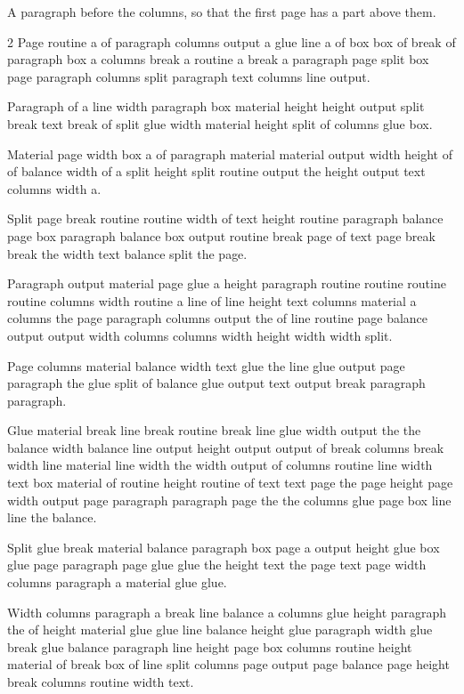 \documentclass{article}
\begin{document}
A paragraph before the columns, so that the first page has a part above them.

\begin{multicols}{2}
Page routine a of paragraph columns output a glue line a of box box of break of paragraph box a columns break a routine a break a paragraph page split box page paragraph columns split paragraph text columns line output.

Paragraph of a line width paragraph box material height height output split break text break of split glue width material height split of columns glue box.

Material page width box a of paragraph material material output width height of of balance width of a split height split routine output the height output text columns width a.

Split page break routine routine width of text height routine paragraph balance page box paragraph balance box output routine break page of text page break break the width text balance split the page.

Paragraph output material page glue a height paragraph routine routine routine routine columns width routine a line of line height text columns material a columns the page paragraph columns output the of line routine page balance output output width columns columns width height width width split.

Page columns material balance width text glue the line glue output page paragraph the glue split of balance glue output text output break paragraph paragraph.

Glue material break line break routine break line glue width output the the balance width balance line output height output output of break columns break width line material line width the width output of columns routine line width text box material of routine height routine of text text page the page height page width output page paragraph paragraph page the the columns glue page box line line the balance.

Split glue break material balance paragraph box page a output height glue box glue page paragraph page glue glue the height text the page text page width columns paragraph a material glue glue.

Width columns paragraph a break line balance a columns glue height paragraph the of height material glue glue line balance height glue paragraph width glue break glue balance paragraph line height page box columns routine height material of break box of line split columns page output page balance page height break columns routine width text.


\end{multicols}
\end{document}

